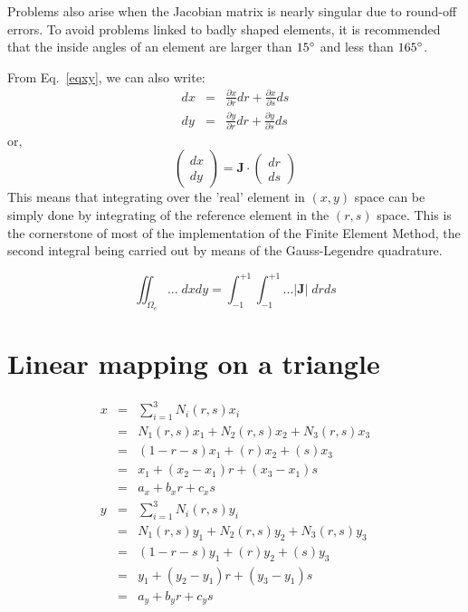 \begin{remark}
Problems also arise when the Jacobian matrix is nearly singular due to round-off errors.
To avoid problems linked to badly shaped elements, it is recommended that the inside
angles of an element are larger than $15\degree$ and less than $165\degree$.
\end{remark}

From Eq.~\eqref{eqxy}, we can also write:
\begin{eqnarray}
dx &=& \frac{\partial x}{\partial r} dr + \frac{\partial x}{\partial s} ds \\
dy &=& \frac{\partial y}{\partial r} dr + \frac{\partial y}{\partial s} ds 
\end{eqnarray}
or, 
\begin{equation}
\left(
\begin{array}{c}
dx \\ dy
\end{array}
\right)
={\bm J}\cdot
\left(
\begin{array}{c}
dr \\ ds
\end{array}
\right)
\end{equation}
This means that integrating over the 'real' element in $(x,y)$ space
can be simply done by integrating of the reference element in the 
$(r,s)$ space. This is the cornerstone of most of the implementation of the 
Finite Element Method, the second integral being carried out by means 
of the Gauss-Legendre quadrature.

\begin{equation}
\iint_{\Omega_e} ... \; dx dy = \int_{-1}^{+1} \int_{-1}^{+1} ...|{\bm J}| \; dr ds
\end{equation}










\section{Linear mapping on a triangle}



\begin{eqnarray}
x 
&=& \sum_{i=1}^3 N_i(r,s) x_i \nonumber\\
&=& N_1(r,s) x_1 +N_2(r,s) x_2 +N_3(r,s) x_3   \nonumber\\
&=&  (1-r-s) x_1 +(r) x_2  +(s) x_3   \nonumber\\
&=& x_1 + (x_2-x_1) r + (x_3-x_1)s \nonumber\\
&=& a_x + b_x r + c_x s \nonumber\\
y 
&=& \sum_{i=1}^3 N_i(r,s) y_i \nonumber\\
&=& N_1(r,s) y_1 +N_2(r,s) y_2 +N_3(r,s) y_3   \nonumber\\
&=&  (1-r-s) y_1 +(r) y_2  +(s) y_3   \nonumber\\
&=& y_1 + (y_2-y_1) r + (y_3-y_1)s \nonumber\\
&=& a_y+ b_y r + c_y s 
\nonumber
\end{eqnarray}

